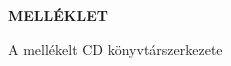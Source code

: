 \documentclass[a4paper,oneside,10pt]{report}
\begin{document}



\newpage

\Large
\begin{center}
	\textbf{MELLÉKLET}
\end{center}
\normalsize
\noindent
A mellékelt CD könyvtárszerkezete







\appendix

\end{document}
